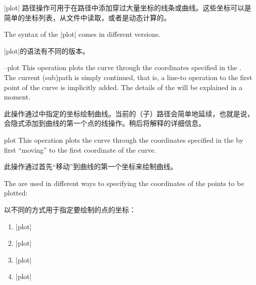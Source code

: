 |plot| 路径操作可用于在路径中添加穿过大量坐标的线条或曲线。这些坐标可以是简单的坐标列表，从文件中读取，或者是动态计算的。

The syntax of the |plot| comes in different versions.

|plot|的语法有不同的版本。

\begin{pathoperation}{--plot}{}
    This operation plots the curve through the coordinates specified in the
    . The current (sub)path is simply continued, that
    is, a line-to operation to the first point of the curve is implicitly
    added. The details of the  will be explained in a
    moment.

    此操作通过中指定的坐标绘制曲线。当前的（子）路径会简单地延续，也就是说，会隐式添加到曲线的第一个点的线操作。稍后将解释的详细信息。

\end{pathoperation}

\begin{pathoperation}{plot}{}
    This operation plots the curve through the coordinates specified in the
     by first ``moving'' to the first coordinate of the
    curve.

    此操作通过首先“移动”到曲线的第一个坐标来绘制曲线。

\end{pathoperation}

The  are used in different ways to specifying the
coordinates of the points to be plotted:

以不同的方式用于指定要绘制的点的坐标：

%
\begin{enumerate}
    \item \opt{|--|}|plot|
    \item \opt{|--|}|plot|
    \item \opt{|--|}|plot|
    \item \opt{|--|}|plot|
\end{enumerate}

